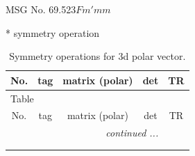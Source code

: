 \documentclass[fleqn,8pt]{jsarticle}
\begin{document}
\setcounter{MaxMatrixCols}{32}

\renewcommand{\tablename}{Table~}
\renewcommand{\figurename}{Figure~}
\begin{center}
\LARGE
MSG No. 69.523\quad$Fm'mm$
\end{center}
* symmetry operation
\renewcommand{\arraystretch}{1.3}
\begin{longtable}{ccccc}
\caption{Symmetry operations for 3d polar vector.}
 \\
 \hline \hline
No. & tag & matrix (polar) & det & TR \\ \hline \endfirsthead

\multicolumn{4}{l}{\tablename\ \thetable{}} \\
 \hline \hline
No. & tag & matrix (polar) & det & TR \\ \hline \endhead

 \hline \hline
\multicolumn{4}{r}{\footnotesize\it continued ...} \\ \endfoot

 \hline \hline
\multicolumn{4}{r}{} \\ \endlastfoot


\end{longtable}
\end{document}
